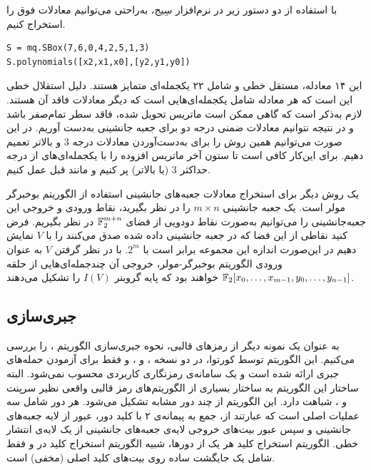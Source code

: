 با استفاده از دو دستور زیر در نرم‌افزار سِیج،  به‌راحتی می‌توانیم معادلات فوق را استخراج کنیم. 
{\footnotesize \begin{latin}
\begin{flushleft}
\begin{lstlisting}	
S = mq.SBox(7,6,0,4,2,5,1,3)
S.polynomials([x2,x1,x0],[y2,y1,y0])
\end{lstlisting}
\end{flushleft}
\end{latin}}
	
این ۱۴ معادله، مستقل خطی و شامل ۲۲ یکجمله‌ای متمایز هستند. دلیل استقلال خطی این است که هر معادله  شامل یکجمله‌ای‌هایی است که دیگر معادلات فاقد آن هستند.  لازم به‌ذکر است که گاهی ممکن است ماتریس تحویل شده، فاقد سطر تمام‌صفر باشد و در نتیجه نتوانیم معادلات ضمنی درجه دو برای جعبه جانشینی به‌دست آوریم. در این صورت می‌توانیم همین روش را برای به‌دست‌آوردن معادلات درجه 
$3$
و بالاتر تعمیم دهیم.  برای این‌کار کافی است تا ستون آخر ماتریس افزوده را با یکجمله‌ای‌های از درجه  حداکثر 
$3$
(یا بالاتر) پر کنیم  و مانند قبل عمل کنیم.  

یک روش دیگر برای استخراج معادلات جعبه‌های جانشینی استفاده از الگوریتم بوخبرگر مولر است.  یک جعبه جانشینی 
$m\times n$
را در نظر بگیرید، نقاط ورودی و خروجی این جعبه‌جانشینی را می‌توانیم به‌صورت نقاط دودویی از فضای 
$\mathbb{F}_{2}^{m + n}$
در نظر بگیریم.  فرض کنید نقاطی  از این فضا که در جعبه جانشینی داده شده‌ صدق می‌کنند  را با 
$V$
نمایش دهیم در این‌صورت اندازه این مجموعه  برابر است با 
$2^{m}$. 
با در نظر گرفتن 
$V$
 به عنوان ورودی الگوریتم بوخبرگر-مولر، خروجی آن چندجمله‌ای‌هایی از  حلقه 
$\mathbb{F}_{2}[x_{0}, \ldots, x_{m-1}, y_{0}, \ldots, y_{n-1}]$
خواهند بود که پایه گروبنر 
$I(V)$
را تشکیل می‌دهند.  



\subsection{جبری‌سازی 
	}
به عنوان یک نمونه دیگر از رمز‌های قالبی، نحوه‌ جبری‌سازی الگوریتم  
، 
را بررسی می‌کنیم. این الگوریتم  توسط کورتوا،  در دو نسخه 
\cite{courtois2007fast}، 
و 
\cite{courtois2007ctc2}، 
و فقط برای آزمودن حمله‌های جبری ارائه  شده  است و یک سامانه‌ی رمزنگاری کاربردی محسوب نمی‌شود.  البته  ساختار این  الگوریتم به ساختار بسیاری از الگوریتم‌های رمز قالبی واقعی نظیر  سرپنت 
و
، 
شباهت دارد. این الگوریتم از چند دور  مشابه تشکیل می‌شود. هر دور  شامل سه عملیات اصلی است که عبارتند از، جمع به پیمانه‌ی ۲ با کلید دور، عبور از لایه‌ جعبه‌های جانشینی و سپس عبور بیت‌های خروجی لایه‌ی جعبه‌های جانشینی از یک لایه‌ی انتشار خطی. الگوریتم استخراج کلید هر یک از دورها،  شبیه الگوریتم استخراج کلید در 
و فقط شامل یک جایگشت ساده روی بیت‌های کلید اصلی (مخفی) است.

